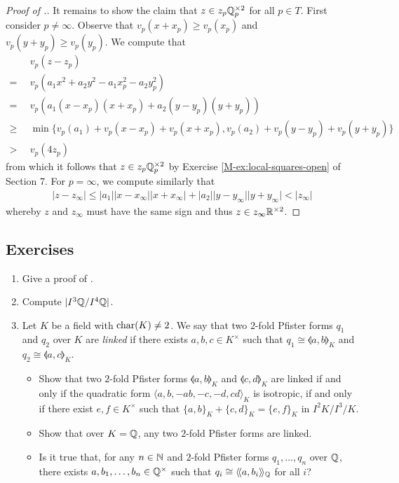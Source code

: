 \documentclass[12pt, leqno, british]{amsart}
\begin{document}
\begin{proof}[Proof of .]
It remains to show the claim that $z \in z_p\mathbb Q_p^{\times 2}$ for all $p \in T$.
First consider $p \neq \infty$.
Observe that $v_p(x + x_p) \geq v_p(x_p)$ and $v_p(y + y_p) \geq v_p(y_p)$.
We compute that
\begin{align*}
&v_p(z - z_p) \\
=\enspace &v_p(a_1x^2 + a_2y^2 - a_1x_p^2 - a_2y_p^2) \\
=\enspace &v_p(a_1(x - x_p)(x + x_p) + a_2(y  - y_p)(y + y_p)) \\
\geq\enspace &\min \lbrace v_p(a_1) + v_p(x - x_p) + v_p(x + x_p), v_p(a_2) + v_p(y - y_p) + v_p(y + y_p) \rbrace \\
>\enspace &v_p(4z_p)
\end{align*}
from which it follows that $z \in z_p\mathbb Q_p^{\times 2}$ by Exercise \eqref{M-ex:local-squares-open} of Section 7.
For $p = \infty$, we compute similarly that
\begin{align*}
\lvert z - z_\infty \rvert \leq \lvert a_1 \rvert \lvert x - x_\infty \rvert \lvert x + x_\infty \rvert + \lvert a_2 \rvert \lvert y - y_\infty \rvert \lvert y + y_\infty \rvert < \lvert z_\infty \rvert
\end{align*}
whereby $z$ and $z_\infty$ must have the same sign and thus $z \in z_\infty\mathbb R^{\times 2}$.
\end{proof}
\subsection{Exercises}
\begin{enumerate}
\item Give a proof of .
\item Compute $\lvert I^3 \mathbb Q/I^4 \mathbb Q \rvert$.
\item Let $K$ be a field with $\operatorname{char}(K) \neq 2$.
We say that two $2$-fold Pfister forms $q_1$ and $q_2$ over $K$ are \emph{linked} if there exists $a, b, c \in K^\times$ such that $q_1 \cong \llangle a, b \rrangle_K$ and $q_2 \cong \llangle a, c \rrangle_K$.
\begin{itemize}
\item Show that two $2$-fold Pfister forms $\llangle a, b \rrangle_K$ and $\llangle c, d \rrangle_K$ are linked if and only if the quadratic form $\langle a, b, -ab, -c, -d, cd \rangle_K$ is isotropic, if and only if there exist $e, f \in K^\times$ such that $\lbrace a, b \rbrace_K + \lbrace c, d \rbrace_K = \lbrace e, f \rbrace_K$ in $I^2K/I^3/K$.
\item Show that over $K = \mathbb Q$, any two $2$-fold Pfister forms are linked.
\item Is it true that, for any $n \in \mathbb N$ and $2$-fold Pfister forms $q_1, \ldots, q_n$ over $\mathbb Q$, there exists $a, b_1, \ldots, b_n \in \mathbb Q^\times$ such that $q_i \cong \langle\!\langle a, b_i \rangle\!\rangle_{\mathbb Q}$ for all $i$?
\end{itemize}
\end{enumerate}
\end{document}
